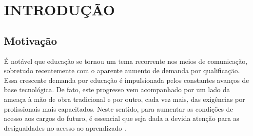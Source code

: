 
\section{INTRODUÇÃO}

\subsection{Motivação}

É notável que educação se tornou um tema recorrente nos meios de comunicação, sobretudo recentemente com o aparente aumento de demanda por qualificação. Essa crescente demanda por educação é impulsionada pelos constantes avanços de base tecnológica. De fato, este progresso vem acompanhado  por um lado da ameaça à mão de obra tradicional e por outro, cada vez mais, das exigências por profissionais mais capacitados. Neste sentido, para aumentar as condições de acesso aos cargos do futuro, é essencial que seja dada a devida atenção para as desigualdades no acesso ao aprendizado \cite[p.~45]{OCDE_2017}.




